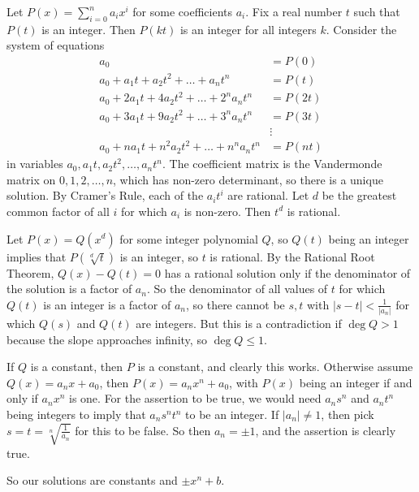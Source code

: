 Let $P\left(x\right)=\displaystyle\sum_{i=0}^na_ix^i$ for some coefficients $a_i$. Fix a real number $t$ such that $P\left(t\right)$ is an integer. Then $P\left(kt\right)$ is an integer for all integers $k$. Consider the system of equations
\begin{align*}
	a_0&=P\left(0\right)\\
	a_0+a_1t+a_2t^2+\ldots+a_nt^n&=P\left(t\right)\\
	a_0+2a_1t+4a_2t^2+\ldots+2^na_nt^n&=P\left(2t\right)\\
	a_0+3a_1t+9a_2t^2+\ldots+3^na_nt^n&=P\left(3t\right)\\
	&\vdots\\
	a_0+na_1t+n^2a_2t^2+\ldots+n^na_nt^n&=P\left(nt\right)
\end{align*}
in variables $a_0,a_1t,a_2t^2,\ldots,a_nt^n$. The coefficient matrix is the Vandermonde matrix on $0,1,2,\ldots,n$, which has non-zero determinant, so there is a unique solution. By Cramer's Rule, each of the $a_it^i$ are rational. Let $d$ be the greatest common factor of all $i$ for which $a_i$ is non-zero. Then $t^d$ is rational.

Let $P\left(x\right)=Q\left(x^d\right)$ for some integer polynomial $Q$, so $Q\left(t\right)$ being an integer implies that $P\left(\sqrt[d]{t}\right)$ is an integer, so $t$ is rational. By the Rational Root Theorem, $Q\left(x\right)-Q\left(t\right)=0$ has a rational solution only if the denominator of the solution is a factor of $a_n$. So the denominator of all values of $t$ for which $Q\left(t\right)$ is an integer is a factor of $a_n$, so there cannot be $s,t$ with $\left|s-t\right|<\frac{1}{\left|a_n\right|}$ for which $Q\left(s\right)$ and $Q\left(t\right)$ are integers. But this is a contradiction if $\deg Q>1$ because the slope approaches infinity, so $\deg Q\leq1$.

If $Q$ is a constant, then $P$ is a constant, and clearly this works. Otherwise assume $Q\left(x\right)=a_nx+a_0$, then $P\left(x\right)=a_nx^n+a_0$, with $P\left(x\right)$ being an integer if and only if $a_nx^n$ is one. For the assertion to be true, we would need $a_ns^n$ and $a_nt^n$ being integers to imply that $a_ns^nt^n$ to be an integer. If $\left|a_n\right|\neq1$, then pick $s=t=\sqrt[n]{\frac{1}{a_n}}$ for this to be false. So then $a_n=\pm1$, and the assertion is clearly true.

So our solutions are constants and $\pm x^n+b$.